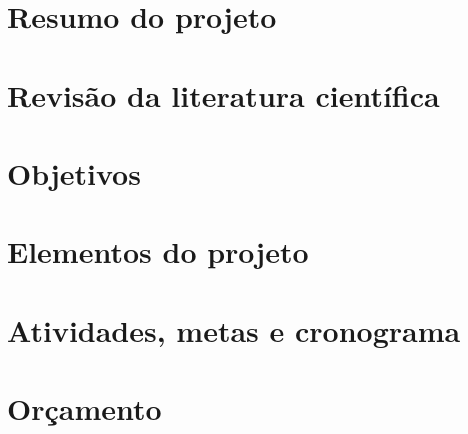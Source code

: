 \newpage

\tableofcontents\newpage


%

\section{Resumo do projeto}%
\label{sec:descr}

\newpage

\section{Revisão da literatura científica}
\label{sec:rev}

\newpage

%

\section{Objetivos}%
\label{sec:obj}

\newpage

\section{Elementos do projeto}
\label{sec:proj}

\newpage

\section{Atividades, metas e cronograma}
\label{sec:cronos}

\newpage

\section{Orçamento}
\label{sec:orc}

\newpage

\printbibliography


